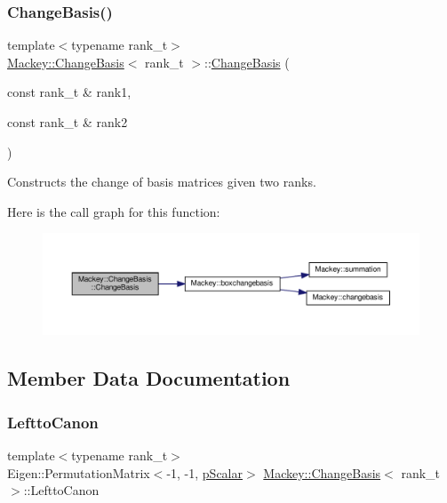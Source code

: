 \subsubsection{\texorpdfstring{Change\+Basis()}{ChangeBasis()}\hspace{0.1cm}{\footnotesize\ttfamily [2/2]}}
{\footnotesize\ttfamily template$<$typename rank\+\_\+t$>$ \\
\hyperlink{classMackey_1_1ChangeBasis}{Mackey\+::\+Change\+Basis}$<$ rank\+\_\+t $>$\+::\hyperlink{classMackey_1_1ChangeBasis}{Change\+Basis} (\begin{DoxyParamCaption}\item[{const rank\+\_\+t \&}]{rank1,  }\item[{const rank\+\_\+t \&}]{rank2 }\end{DoxyParamCaption})\hspace{0.3cm}{\ttfamily [inline]}}



Constructs the change of basis matrices given two ranks. 

Here is the call graph for this function\+:\nopagebreak
\begin{figure}[H]
\begin{center}
\leavevmode
\includegraphics[width=350pt]{classMackey_1_1ChangeBasis_a036c1f54ffb4cf4115efa2fab60c354b_cgraph}
\end{center}
\end{figure}


\subsection{Member Data Documentation}
\mbox{\label{classMackey_1_1ChangeBasis_aac6a5b932e7feea82c94447d541e6ded}} 
\subsubsection{\texorpdfstring{Leftto\+Canon}{LefttoCanon}}
{\footnotesize\ttfamily template$<$typename rank\+\_\+t$>$ \\
Eigen\+::\+Permutation\+Matrix$<$-\/1, -\/1, \hyperlink{namespaceMackey_a67b5f4650ba2f166d15133a1bea2472b}{p\+Scalar}$>$ \hyperlink{classMackey_1_1ChangeBasis}{Mackey\+::\+Change\+Basis}$<$ rank\+\_\+t $>$\+::Leftto\+Canon}



